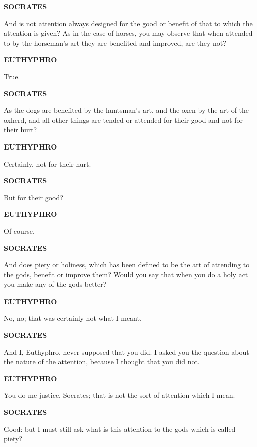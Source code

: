 \documentclass[11pt,letter]{article}
\begin{document}
\par \textbf{SOCRATES}
\par   And is not attention always designed for the good or benefit of that to which the attention is given? As in the case of horses, you may observe that when attended to by the horseman's art they are benefited and improved, are they not?

\par \textbf{EUTHYPHRO}
\par   True.

\par \textbf{SOCRATES}
\par   As the dogs are benefited by the huntsman's art, and the oxen by the art of the oxherd, and all other things are tended or attended for their good and not for their hurt?

\par \textbf{EUTHYPHRO}
\par   Certainly, not for their hurt.

\par \textbf{SOCRATES}
\par   But for their good?

\par \textbf{EUTHYPHRO}
\par   Of course.

\par \textbf{SOCRATES}
\par   And does piety or holiness, which has been defined to be the art of attending to the gods, benefit or improve them? Would you say that when you do a holy act you make any of the gods better?

\par \textbf{EUTHYPHRO}
\par   No, no; that was certainly not what I meant.

\par \textbf{SOCRATES}
\par   And I, Euthyphro, never supposed that you did. I asked you the question about the nature of the attention, because I thought that you did not.

\par \textbf{EUTHYPHRO}
\par   You do me justice, Socrates; that is not the sort of attention which I mean.

\par \textbf{SOCRATES}
\par   Good:  but I must still ask what is this attention to the gods which is called piety?
\end{document}
